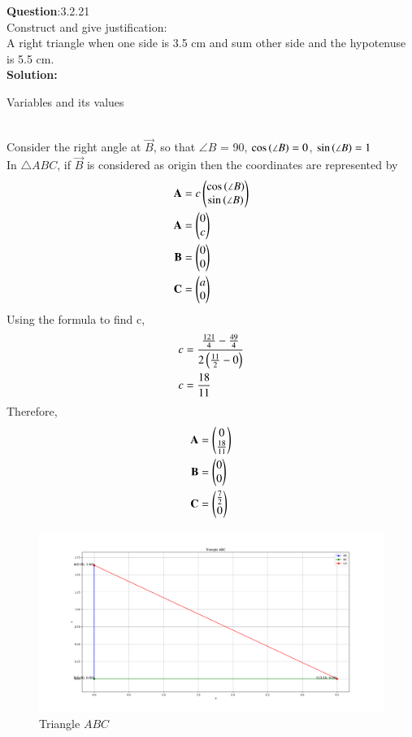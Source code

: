 \documentclass[journal]{IEEEtran}
\begin{document}
\textbf{Question}:3.2.21\\
Construct and give justification:\\
A right triangle when one side is 3.5 cm and sum other side and the hypotenuse is 5.5 cm.
\\
\textbf{Solution:}
\renewcommand{\tablename}{Table 3.2.21.1}
\begin{table}[h!]
  \centering
  
  \caption{Variables and its values}
\end{table}
\\
Consider the right angle at $\vec{B}$, so that $\angle B$ = 90\degree, $\cos{\ensuremath{\left(\angle B\right)}} = 0$, $\sin{\ensuremath{\left(\angle B\right)}} = 1$\\
In $\triangle ABC$, if $\vec{B}$ is considered as origin then the coordinates are represented by
 \begin{align}
 \mathbf{A} & = c\begin{pmatrix}\cos{\ensuremath{\left(\angle B\right)}} \\ \sin{\ensuremath{\left(\angle B\right)}}\end{pmatrix} \\
 \mathbf{A} & = \begin{pmatrix}0 \\ c\end{pmatrix} \\
 \mathbf{B} & = \begin{pmatrix}0 \\ 0\end{pmatrix} \\
 \mathbf{C} & = \begin{pmatrix}a \\ 0\end{pmatrix}
 \end{align}
Using the formula to find c,
\begin{align}
c & = \frac{\frac{121}{4} - \frac{49}{4}}{2\left(\frac{11}{2} - 0\right)} \\
c & = \frac{18}{11}
\end{align}
Therefore,
\begin{align}
    \mathbf{A} & = \begin{pmatrix}0 \\ \frac{18}{11}\end{pmatrix} \\
    \mathbf{B} & = \begin{pmatrix}0 \\ 0\end{pmatrix} \\
    \mathbf{C} & = \begin{pmatrix}\frac{7}{2} \\ 0\end{pmatrix}
\end{align}
\begin{figure}[h!]
   \centering
   \includegraphics[width=0.7\linewidth]{figs/triangle.png}
	\caption{Triangle $ABC$}
   \end{figure}
\end{document}
